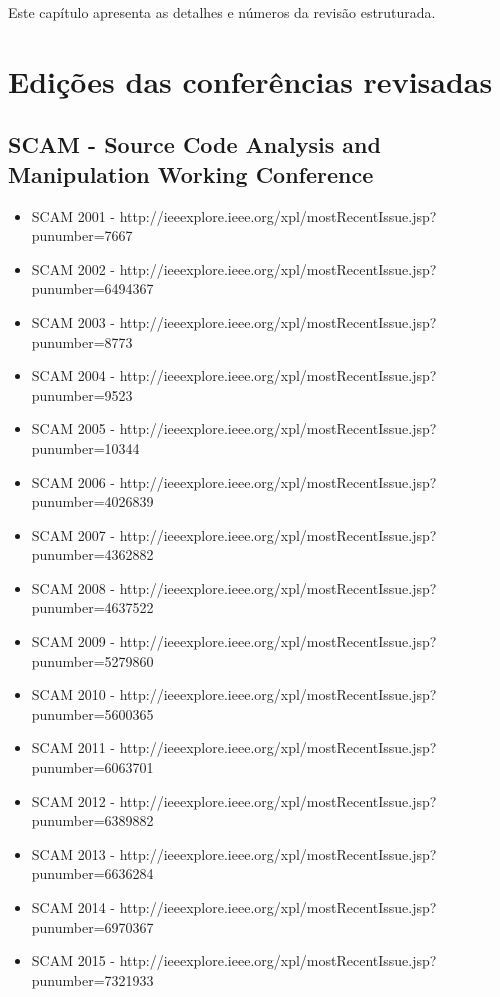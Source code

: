 {Este capítulo apresenta as detalhes e números da revisão estruturada.}

\section{Edições das conferências revisadas}
\label{edicoes-conferencias}

\subsection{SCAM - Source Code Analysis and Manipulation Working Conference}

\begin{itemize}
  \item SCAM 2001 - {\small http://ieeexplore.ieee.org/xpl/mostRecentIssue.jsp?punumber=7667}
  \item SCAM 2002 - {\small http://ieeexplore.ieee.org/xpl/mostRecentIssue.jsp?punumber=6494367}
  \item SCAM 2003 - {\small http://ieeexplore.ieee.org/xpl/mostRecentIssue.jsp?punumber=8773}
  \item SCAM 2004 - {\small http://ieeexplore.ieee.org/xpl/mostRecentIssue.jsp?punumber=9523}
  \item SCAM 2005 - {\small http://ieeexplore.ieee.org/xpl/mostRecentIssue.jsp?punumber=10344}
  \item SCAM 2006 - {\small http://ieeexplore.ieee.org/xpl/mostRecentIssue.jsp?punumber=4026839}
  \item SCAM 2007 - {\small http://ieeexplore.ieee.org/xpl/mostRecentIssue.jsp?punumber=4362882}
  \item SCAM 2008 - {\small http://ieeexplore.ieee.org/xpl/mostRecentIssue.jsp?punumber=4637522}
  \item SCAM 2009 - {\small http://ieeexplore.ieee.org/xpl/mostRecentIssue.jsp?punumber=5279860}
  \item SCAM 2010 - {\small http://ieeexplore.ieee.org/xpl/mostRecentIssue.jsp?punumber=5600365}
  \item SCAM 2011 - {\small http://ieeexplore.ieee.org/xpl/mostRecentIssue.jsp?punumber=6063701}
  \item SCAM 2012 - {\small http://ieeexplore.ieee.org/xpl/mostRecentIssue.jsp?punumber=6389882}
  \item SCAM 2013 - {\small http://ieeexplore.ieee.org/xpl/mostRecentIssue.jsp?punumber=6636284}
  \item SCAM 2014 - {\small http://ieeexplore.ieee.org/xpl/mostRecentIssue.jsp?punumber=6970367}
  \item SCAM 2015 - {\small http://ieeexplore.ieee.org/xpl/mostRecentIssue.jsp?punumber=7321933}
\end{itemize}

